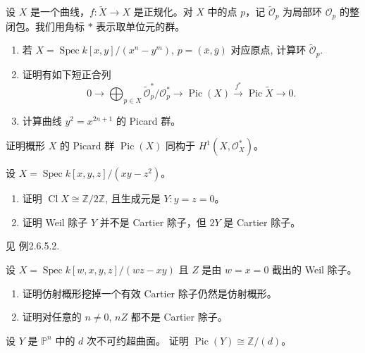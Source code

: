 \begin{exercise}[曲线的Picard群]
    设 $X$ 是一个曲线，$f: \tilde{X} \rightarrow X$ 是正规化。对 $X$ 中的点 $p$，记 $\tilde{\mathcal{O}}_{p}$ 为局部环 $\mathcal{O}_{p}$ 的整闭包。我们用角标 $*$ 表示取单位元的群。
    \begin{enumerate}
        \item 若 $X=\operatorname{Spec} k[x, y] /(x^{n} - y^{m})$, 
        $p=(\bar{x}, \bar{y})$ 对应原点, 计算环 $\widetilde{\mathcal{O}}_{p}$.
        \item 证明有如下短正合列
            $$
                0 \rightarrow \bigoplus_{p \in X} \tilde{\mathcal{O}}_{p}^{*} / \mathcal{O}_{p}^{*} \rightarrow \operatorname{Pic}(X) \stackrel{f^{*}}{\longrightarrow} \operatorname{Pic} \tilde{X} \rightarrow 0.
            $$
        \item 计算曲线 $y^{2}=x^{2 n+1}$ 的 Picard 群。
    \end{enumerate}
\end{exercise}

\begin{exercise}[Picard群]
    证明概形 $X$ 的 Picard 群 $\operatorname{Pic}(X)$ 同构于 $H^{1}(X, \mathcal{O}_{X}^{*})$。
\end{exercise}

\begin{exercise}[除子]
    设 $X=\operatorname{Spec} k[x, y, z] /\left(x y-z^{2}\right)$。
    \begin{enumerate}
        \item 证明 $\operatorname{Cl} X \cong \mathbb{Z} / 2 \mathbb{Z}$, 且生成元是 $Y: y=z=0$。
        \item 证明 Weil 除子 $Y$ 并不是 Cartier 除子，但 $2 Y$ 是 Cartier 除子。
    \end{enumerate}
\end{exercise}

见\cite{Har77} 例2.6.5.2.

\begin{exercise}[除子]
    设 $X=\operatorname{Spec} k[w, x, y, z] /(w z-x y)$ 且 $Z$ 是由 $w=x=0$ 截出的 Weil 除子。
    \begin{enumerate}
        \item 证明仿射概形挖掉一个有效 Cartier 除子仍然是仿射概形。
        \item 证明对任意的 $n \neq 0$, $n Z$ 都不是 Cartier 除子。
    \end{enumerate}
\end{exercise}

\begin{exercise}[Picard群]
    设 $Y$ 是 $\mathbb{P}^{n}$ 中的 $d$ 次不可约超曲面。
    证明 $\operatorname{Pic}(Y) \cong \mathbb{Z} /(d)$。
\end{exercise}

